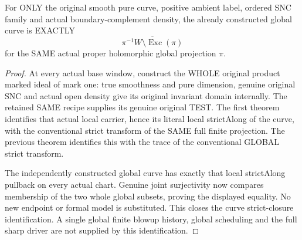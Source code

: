 \begin{theorem}
\label{hir:sharp-actual-original-global-curve-strict-closure}
\leanok
For ONLY the original smooth pure curve, positive ambient label, ordered
SNC family and actual boundary-complement density, the already
constructed global curve is EXACTLY
\[
 \overline{\pi^{-1}W\setminus\operatorname{Exc}(\pi)}
\]
for the SAME actual proper holomorphic global projection $\pi$.
\end{theorem}
\begin{proof}
At every actual base window, construct the WHOLE original product marked
ideal of mark one: true smoothness and pure dimension, genuine original
SNC and actual open density give its original invariant domain internally.
The retained SAME recipe supplies its genuine original TEST. The first
theorem identifies that actual local carrier, hence its literal local
strictAlong of the curve, with the conventional strict transform of
the SAME full finite projection. The previous theorem identifies this
with the trace of the conventional GLOBAL strict transform.

The independently constructed global curve has exactly that local
strictAlong pullback on every actual chart. Genuine joint surjectivity
now compares membership of the two whole global subsets, proving the
displayed equality. No new endpoint or formal model is substituted.
This closes the curve strict-closure identification. A single global
finite blowup history, global scheduling and the full sharp driver are
not supplied by this identification.
\end{proof}
